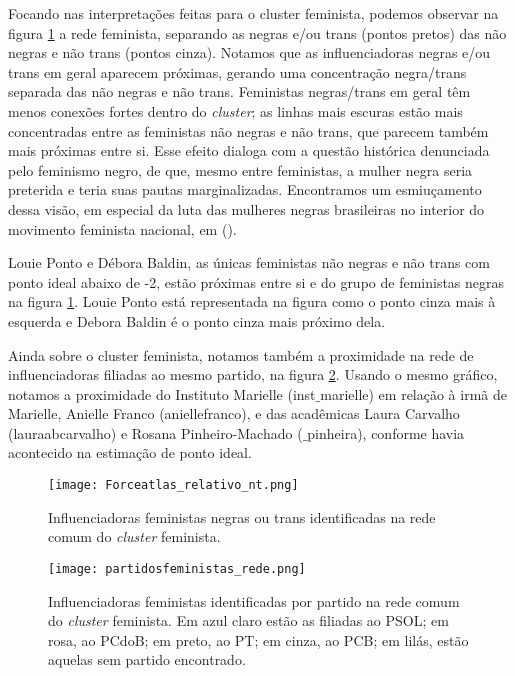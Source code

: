 \documentclass[
	12pt,				%
	openright,			%
	twoside,			%
	a4paper,			%
	english,			%
	brazil				%
	]{abntex2}
\begin{document}
 Focando nas interpretações feitas para o cluster feminista, podemos observar na figura \ref{negrastransrede} a rede feminista, separando as negras e/ou trans (pontos pretos) das não negras e não trans (pontos cinza). Notamos que as influenciadoras negras e/ou trans em geral aparecem próximas, gerando uma concentração negra/trans separada das não negras e não trans. Feministas negras/trans em geral têm menos conexões fortes dentro do \textit{cluster}; as linhas mais escuras estão mais concentradas entre as feministas não negras e não trans, que parecem também mais próximas entre si. Esse efeito dialoga com a questão histórica denunciada pelo feminismo negro, de que, mesmo entre feministas, a mulher negra seria preterida e teria suas pautas marginalizadas. Encontramos um esmiuçamento dessa visão, em especial da luta das mulheres negras brasileiras no interior do movimento feminista nacional, em  (\citeyear{carneiro2003}).

 Louie Ponto e Débora Baldin, as únicas feministas não negras e não trans com ponto ideal abaixo de -2, estão próximas entre si e do grupo de feministas negras na figura \ref{negrastransrede}. Louie Ponto está representada na figura como o ponto cinza mais à esquerda e Debora Baldin é o ponto cinza mais próximo dela.
 
 Ainda sobre o cluster feminista, notamos também a proximidade na rede de influenciadoras filiadas ao mesmo partido, na figura \ref{partidasrede}. Usando o mesmo gráfico, notamos a proximidade do Instituto Marielle (inst$\_$marielle) em relação à irmã de Marielle, Anielle Franco (aniellefranco), e das acadêmicas Laura Carvalho (lauraabcarvalho) e Rosana Pinheiro-Machado ($\_$pinheira), conforme havia acontecido na estimação de ponto ideal.

 \begin{figure}[!htbp]
    \centering
    \texttt{[image: Forceatlas\_relativo\_nt.png]}
    \caption{Influenciadoras feministas negras ou trans identificadas na rede comum do \textit{cluster} feminista.}
    \label{negrastransrede}
 \end{figure}

 \begin{figure}[!htbp]
    \centering
    \texttt{[image: partidosfeministas\_rede.png]}
    \caption{Influenciadoras feministas identificadas por partido na rede comum do \textit{cluster} feminista. Em azul claro estão as filiadas ao PSOL; em rosa, ao PCdoB; em preto, ao PT; em cinza, ao PCB; em lilás, estão aquelas sem partido encontrado.}
    \label{partidasrede}
 \end{figure}
\end{document}
